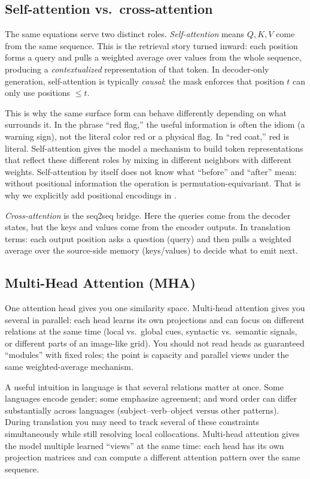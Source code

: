 \subsection{Self-attention vs.\ cross-attention}
\label{sec:transformers_self_attention_vs_cross_attention}
The same equations serve two distinct roles.
\emph{Self-attention} means \(Q,K,V\) come from the same sequence. This is the retrieval story turned inward:
each position forms a query and pulls a weighted average over values from the whole sequence, producing a
\emph{contextualized} representation of that token. In decoder-only generation, self-attention is typically
\emph{causal}: the mask enforces that position \(t\) can only use positions \(\le t\).

This is why the same surface form can behave differently depending on what surrounds it. In the phrase
``red flag,'' the useful information is often the idiom (a warning sign), not the literal color red or a physical
flag. In ``red coat,'' red is literal. Self-attention gives the model a mechanism to build token
representations that reflect these different roles by mixing in different neighbors with different weights.
Self-attention by itself does not know what ``before'' and ``after'' mean: without positional information the operation is permutation-equivariant. That is why we explicitly add positional encodings in .

\emph{Cross-attention} is the seq2seq bridge. Here the queries come from the decoder states, but the keys and values come from the encoder outputs. In translation terms: each output position asks a question (query) and then pulls a weighted average over the source-side memory (keys/values) to decide what to emit next.

\subsection{Multi-Head Attention (MHA)}
\label{sec:transformers_multi_head_attention_mha}
One attention head gives you one similarity space. Multi-head attention gives you several in parallel: each head learns its own projections and can focus on different relations at the same time (local vs.\ global cues, syntactic vs.\ semantic signals, or different parts of an image-like grid). You should not read heads as guaranteed ``modules'' with fixed roles; the point is capacity and parallel views under the same weighted-average mechanism.

A useful intuition in language is that several relations matter at once. Some languages encode gender;
some emphasize agreement; and word order can differ substantially across languages (subject--verb--object versus
other patterns). During translation you may need to track several of these constraints simultaneously while still
resolving local collocations. Multi-head attention gives the model multiple learned ``views'' at the same time:
each head has its own projection matrices and can compute a different attention pattern over the same sequence.

